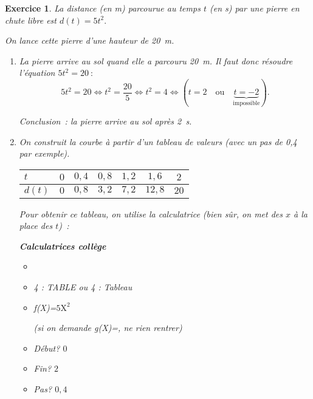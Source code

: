 \documentclass[10pt]{article}
\newtheorem{exo}{Exercice}
\begin{document}
\begin{exo}

La distance (en m) parcourue au temps $t$ (en s) par une pierre en chute libre est $d(t)=5t^2.$

On lance cette pierre d'une hauteur de 20~m.



\begin{enumerate}
\item La pierre arrive au sol quand elle a parcouru 20~m. Il faut donc résoudre l'équation $5t^2=20~:$
\[5t^2=20\iff t^2=\frac{20}{5}\iff t^2=4\iff \left(t=2\quad\text{ou}\quad\underbrace{t=-2}_{\text{impossible}}\right).\]

Conclusion~: la pierre arrive au sol après 2~s.
\item On construit la courbe à partir d'un tableau de valeurs (avec un pas de 0,4 par exemple).

\begin{center}
\begin{tabular}{|l|c|c|c|c|c|c|}
\hline
   $t$ &$0$ &$0,4$ &$0,8$ &$1,2$ &$1,6$&$2$ \\
	\hline
	$d(t)$ &$0$ &$0,8$ &$3,2$ &$7,2$ &$12,8$&$20$ \\
	\hline
\end{tabular}
\end{center}

Pour obtenir ce tableau, on utilise la calculatrice (bien sûr, on met des $x$ à la place des $t$)~:

\medskip

\small

\setlength{\columnseprule}{1pt}
\begin{multicols}{4}

\begin{center}\textbf{Calculatrices collège}\end{center}

\medskip


\begin{itemize}
\item[\textbullet] 
\item[\textbullet] 4 : TABLE ou 4 : Tableau
\item[\textbullet] f(X)=$5\text{X}^2$ 

(si on demande g(X)=, ne rien rentrer)
\item[\textbullet] Début? $0$ 
\item[\textbullet] Fin? $2$ 
\item[\textbullet] Pas? $0,4$ 
\end{itemize}


\end{multicols}
\end{enumerate}
\end{exo}
\end{document}
